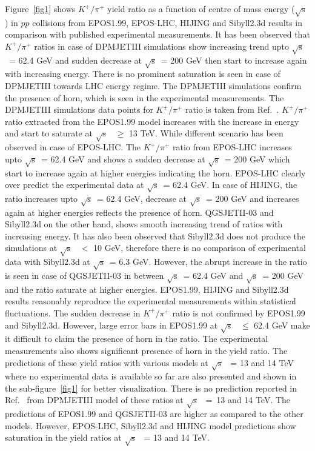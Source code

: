 \documentclass{article}
\newcommand{\sqrts}{\mbox{$\sqrt{\mathrm{s}}$}}
\begin{document}
Figure~\ref{fig1} shows $K^+/\pi^+$ yield ratio as a function of centre of mass energy (\sqrts) in $pp$ collisions from EPOS1.99, EPOS-LHC, HIJING and Sibyll2.3d results in comparison with published experimental measurements. It has been observed that $K^+/\pi^+$ ratios in case of DPMJETIII simulations show increasing trend upto \sqrts~= 62.4 GeV and sudden decrease at \sqrts~= 200 GeV then start to increase again with increasing energy. There is no prominent saturation is seen in case of DPMJETIII towards LHC energy regime. The DPMJETIII simulations confirm the presence of horn, which is seen in the experimental measurements. The DPMJETIII simulations data points for $K^+/\pi^+$ ratio is taken from Ref.~\cite{Bhattacharyya:2017rmc}. $K^+/\pi^+$ ratio extracted from the EPOS1.99 model increases with the increase in energy and start to saturate at \sqrts~ $\ge$ 13 TeV. While different scenario has been observed in case of EPOS-LHC. The $K^+/\pi^+$ ratio from EPOS-LHC increases upto \sqrts~= 62.4 GeV and shows a sudden decrease at \sqrts~= 200 GeV which start to increase again at higher energies indicating the horn. EPOS-LHC clearly over predict the experimental data at \sqrts~= 62.4 GeV. In case of HIJING, the ratio increases upto \sqrts~= 62.4 GeV, decrease at \sqrts~= 200 GeV and increases again at higher energies reflects the presence of horn. QGSJETII-03 and Sibyll2.3d on the other hand, shows smooth increasing trend of ratios with increasing energy. It has also been observed that Sibyll2.3d does not produce the simulations at \sqrts~ $<$ 10 GeV, therefore there is no comparison of experimental data with Sibyll2.3d at \sqrts~= 6.3 GeV. However, the abrupt increase in the ratio is seen in case of QGSJETII-03 in between \sqrts~= 62.4 GeV and \sqrts~= 200 GeV and the ratio saturate at higher energies. EPOS1.99, HIJING and Sibyll2.3d results reasonably reproduce the experimental measurements within statistical fluctuations. The sudden decrease in $K^+/\pi^+$ ratio is not confirmed by EPOS1.99 and Sibyll2.3d. However, large error bars in EPOS1.99 at \sqrts~ $\le$ 62.4 GeV make it difficult to claim the presence of horn in the ratio. The experimental measurements also shows significant presence of horn in the yield ratio. The predictions of these yield ratios with various models at \sqrts~ = 13 and 14 TeV where no experimental data is available so far are also presented and shown in the sub-figure~\ref{fig1} for better visualization. There is no prediction reported in Ref.~\cite{Bhattacharyya:2017rmc} from DPMJETIII model of these ratios at \sqrts~ =~13 and 14 TeV. The predictions of EPOS1.99 and QGSJETII-03 are higher as compared to the other models. However, EPOS-LHC, Sibyll2.3d and HIJING model predictions show saturation in the yield ratios at \sqrts~ = 13 and 14 TeV. 
\end{document}
